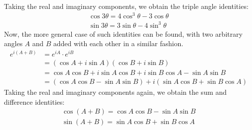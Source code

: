 \begin{sol}
\begin{enumerate}[label=\textbf{(\alph*)}]
\begin{align*}
\end{align*}
Taking the real and imaginary components, we obtain the triple angle identities:
\begin{align*}
    \cos{3\theta} = 4\cos^3\theta - 3\cos\theta \\
    \sin{3\theta} = 3\sin\theta - 4\sin^3\theta
\end{align*}
Now, the more general case of such identities can be found, with two arbitrary angles $A$ and $B$ added with each other in a similar fashion.
\begin{align*}
    e^{i(A + B)} &= e^{iA} \cdot e^{iB} \\ &= (\cos{A} + i\sin{A})(\cos{B} + i\sin{B}) \\ &= \cos{A}\cos{B} + i\sin{A}\cos{B} + i\sin{B}\cos{A} - \sin{A}\sin{B} \\ &= (\cos{A}\cos{B} - \sin{A}\sin{B}) + i(\sin{A}\cos{B} + \sin{B}\cos{A})
\end{align*}
Taking the real and imaginary components again, we obtain the sum and difference identities:
\begin{align*}
    \cos{(A + B)} = \cos{A}\cos{B} - \sin{A}\sin{B} \\
    \sin{(A + B)} = \sin{A}\cos{B} + \sin{B}\cos{A}
\end{align*}
\end{enumerate}
\end{sol}